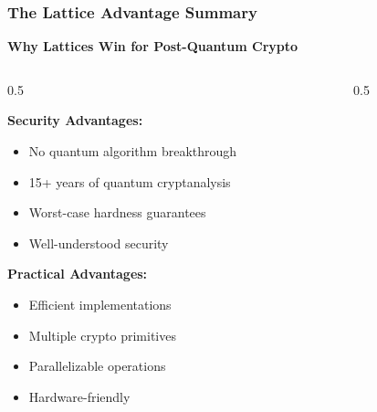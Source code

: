 \documentclass[aspectratio=169,10pt]{beamer}
\newcommand{\slideheader}[1]{\frametitle{#1}}
\theoremstyle{plain}
\begin{document}
\begin{frame}
  \slideheader{The Lattice Advantage Summary}
  
  \begin{center}
    \textbf{\large Why Lattices Win for Post-Quantum Crypto}
  \end{center}
  
  \vspace{0.5cm}
  
  \begin{columns}
    \begin{column}{0.5\textwidth}
      \begin{greenBox}
        \textbf{Security Advantages:}
        \begin{itemize}
          \item[\checkmark] No quantum algorithm breakthrough
          \item[\checkmark] 15+ years of quantum cryptanalysis
          \item[\checkmark] Worst-case hardness guarantees
          \item[\checkmark] Well-understood security
        \end{itemize}
      \end{greenBox}
      
      \vspace{0.3cm}
      
      \begin{greenBox}
        \textbf{Practical Advantages:}
        \begin{itemize}
          \item[\checkmark] Efficient implementations
          \item[\checkmark] Multiple crypto primitives
          \item[\checkmark] Parallelizable operations
          \item[\checkmark] Hardware-friendly
        \end{itemize}
      \end{greenBox}
    \end{column}
    
    \begin{column}{0.5\textwidth}
\end{column}
\end{columns}
\end{frame}
\end{document}
